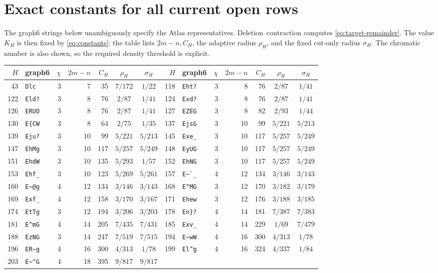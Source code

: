 \documentclass[11pt]{article}
\begin{document}
\section{Exact constants for all current open rows}

The graph6 strings below unambiguously specify the Atlas representatives.
Deletion--contraction computes \eqref{eq:target-remainder}.  The value $K_H$
is then fixed by \eqref{eq:constants}; the table lists $2m-n,C_H$, the
adaptive radius $\rho_H$, and the fixed cut-only radius $\sigma_H$.  The
chromatic number is also shown, so the required density threshold is explicit.

\begin{center}
\scriptsize
\setlength{\tabcolsep}{5pt}
\begin{longtable}{r@{\;}lrrrcc@{\quad}r@{\;}lrrrcc}
$H$&graph6&$\chi$&$2m-n$&$C_H$&$\rho_H$&$\sigma_H$&
$H$&graph6&$\chi$&$2m-n$&$C_H$&$\rho_H$&$\sigma_H$\\ \hline
43&\verb|Dlc|&3&7&35&$7/172$&$1/22$&118&\verb|Eht?|&3&8&76&$2/87$&$1/41$\\
122&\verb|Eld?|&3&8&76&$2/87$&$1/41$&124&\verb|Exd?|&3&8&76&$2/87$&$1/41$\\
126&\verb|ERUO|&3&8&76&$2/87$&$1/41$&127&\verb|EZEG|&3&8&82&$2/93$&$1/44$\\
130&\verb|E{CW|&3&8&64&$2/75$&$1/35$&137&\verb|EjsG|&3&10&99&$5/221$&$5/213$\\
139&\verb|Eju?|&3&10&99&$5/221$&$5/213$&145&\verb|Exe_|&3&10&117&$5/257$&$5/249$\\
147&\verb|EhMg|&3&10&117&$5/257$&$5/249$&148&\verb|EyUG|&3&10&117&$5/257$&$5/249$\\
151&\verb|EhdW|&3&10&135&$5/293$&$1/57$&152&\verb|EhNG|&3&10&117&$5/257$&$5/249$\\
153&\verb|Ehf_|&3&10&123&$5/269$&$5/261$&157&\verb|E~`_|&4&12&134&$3/146$&$3/143$\\
160&\verb|E~@g|&4&12&134&$3/146$&$3/143$&168&\verb|E^MG|&3&12&170&$3/182$&$3/179$\\
169&\verb|Exf_|&4&12&158&$3/170$&$3/167$&171&\verb|Ehew|&3&12&176&$3/188$&$3/185$\\
174&\verb|EtTg|&3&12&194&$3/206$&$3/203$&178&\verb|En}?|&4&14&181&$7/387$&$7/383$\\
181&\verb|E^mG|&4&14&205&$7/435$&$7/431$&185&\verb|Exv_|&4&14&229&$1/69$&$7/479$\\
188&\verb|EzNG|&3&14&247&$7/519$&$7/515$&194&\verb|E~wW|&4&16&300&$4/313$&$1/78$\\
196&\verb|ER~g|&4&16&300&$4/313$&$1/78$&199&\verb|El^g|&4&16&324&$4/337$&$1/84$\\
203&\verb|E~^G|&4&18&395&$9/817$&$9/817$&&&&&&&
\end{longtable}
\normalsize
\end{center}
\end{document}
